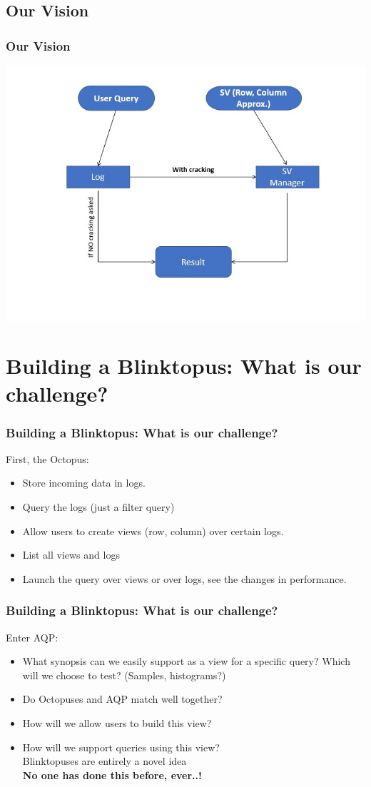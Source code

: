 \documentclass{beamer}
\begin{document}
\subsection{Our Vision}
\begin{frame}
\frametitle{Our Vision}
\includegraphics[scale=0.45]{img/flow.jpeg}
\end{frame}

\section{Building a Blinktopus: What is our challenge?}
\begin{frame}
\frametitle{Building a Blinktopus: What is our challenge?}
First, the Octopus:
\begin{itemize}
\item{Store incoming data in logs.}
\item{Query the logs (just a filter query)}
\item{Allow users to create views (row, column) over certain logs.}
\item{List all views and logs}
\item{Launch the query over views or over logs, see the changes in performance.}
\end{itemize}
\end{frame}
\begin{frame}
\frametitle{Building a Blinktopus: What is our challenge?}
Enter AQP:
\begin{itemize}
\item{What synopsis can we easily support as a view for a specific query? Which will we choose to test? (Samples, histograms?)}
\item{Do Octopuses and AQP match well together?}
\item{How will we allow users to build this view?}
\item{How will we support queries using this view?}\\
\vspace{0.5 cm}
Blinktopuses are entirely a novel idea\\ \textbf{No one has done this before, ever..!}
\end{itemize}
\end{frame}
\end{document}
